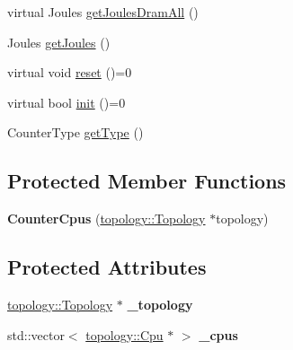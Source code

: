 \begin{DoxyCompactItemize}
\item 
virtual Joules \hyperlink{classmammut_1_1energy_1_1CounterCpus_acaadefab12684f3674f3a801d918573d}{get\-Joules\-Dram\-All} ()
\item 
Joules \hyperlink{classmammut_1_1energy_1_1CounterCpus_a6f6471724522433e88f07d60456671e5}{get\-Joules} ()
\item 
virtual void \hyperlink{classmammut_1_1energy_1_1CounterCpus_ac3d2b3c06119c5e4f077b05689b2374a}{reset} ()=0
\item 
virtual bool \hyperlink{classmammut_1_1energy_1_1CounterCpus_af4496166c7b79cd60fe57baa4b6e72a1}{init} ()=0
\item 
Counter\-Type \hyperlink{classmammut_1_1energy_1_1CounterCpus_ad84d1173e2629965b2e2bcc823e028b7}{get\-Type} ()
\end{DoxyCompactItemize}
\subsection*{Protected Member Functions}
\begin{DoxyCompactItemize}
\item 
\hypertarget{classmammut_1_1energy_1_1CounterCpus_a0a27e24202f786849a1dc5b2aaec97f9}{{\bfseries Counter\-Cpus} (\hyperlink{classmammut_1_1topology_1_1Topology}{topology\-::\-Topology} $\ast$topology)}\label{classmammut_1_1energy_1_1CounterCpus_a0a27e24202f786849a1dc5b2aaec97f9}

\end{DoxyCompactItemize}
\subsection*{Protected Attributes}
\begin{DoxyCompactItemize}
\item 
\hypertarget{classmammut_1_1energy_1_1CounterCpus_a8bf39ebc967a0b2ba256e34eeb7694e6}{\hyperlink{classmammut_1_1topology_1_1Topology}{topology\-::\-Topology} $\ast$ {\bfseries \-\_\-topology}}\label{classmammut_1_1energy_1_1CounterCpus_a8bf39ebc967a0b2ba256e34eeb7694e6}

\item 
\hypertarget{classmammut_1_1energy_1_1CounterCpus_a8af8ffffde962f5087f7aa23b3794c53}{std\-::vector$<$ \hyperlink{classmammut_1_1topology_1_1Cpu}{topology\-::\-Cpu} $\ast$ $>$ {\bfseries \-\_\-cpus}}\label{classmammut_1_1energy_1_1CounterCpus_a8af8ffffde962f5087f7aa23b3794c53}

\end{DoxyCompactItemize}


